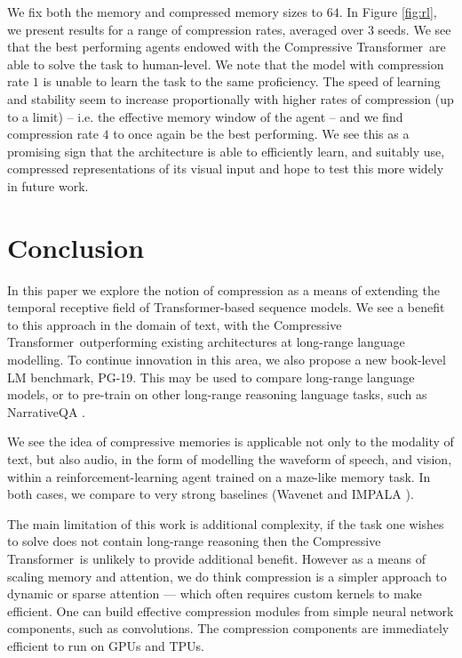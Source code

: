 We fix both the memory and compressed memory sizes to $64$. In Figure \ref{fig:rl}, we present results for a range of compression rates, averaged over $3$ seeds. We see that the best performing agents endowed with the Compressive Transformer~are able to solve the task to human-level. We note that the model with compression rate $1$ is unable to learn the task to the same proficiency. The speed of learning and stability seem to increase proportionally with higher rates of compression (up to a limit) -- i.e. the effective memory window of the agent -- and we find compression rate $4$ to once again be the best performing. We see this as a promising sign that the architecture is able to efficiently learn, and suitably use,  compressed representations of its visual input and hope to test this more widely in future work. 

\section{Conclusion}
In this paper we explore the notion of compression as a means of extending the temporal receptive field of Transformer-based sequence models. We see a benefit to this approach in the domain of text, with the Compressive Transformer~outperforming existing architectures at long-range language modelling. To continue innovation in this area, we also propose a new book-level LM benchmark, PG-19. This may be used to compare long-range language models, or to pre-train on other long-range reasoning language tasks, such as NarrativeQA \citep{kovcisky2018narrativeqa}.

We see the idea of compressive memories is applicable not only to the modality of text, but also audio, in the form of modelling the waveform of speech, and vision, within a reinforcement-learning agent trained on a maze-like memory task. In both cases, we compare to very strong baselines (Wavenet \citep{oord2016wavenet} and IMPALA \citep{espeholt2018impala}).

The main limitation of this work is additional complexity, if the task one wishes to solve does not contain long-range reasoning then the Compressive Transformer~is unlikely to provide additional benefit. However as a means of scaling memory and attention, we do think compression is a simpler approach to dynamic or sparse attention --- which often requires custom kernels to make efficient. One can build effective compression modules from simple neural network components, such as convolutions. The compression components are immediately efficient to run on GPUs and TPUs.

